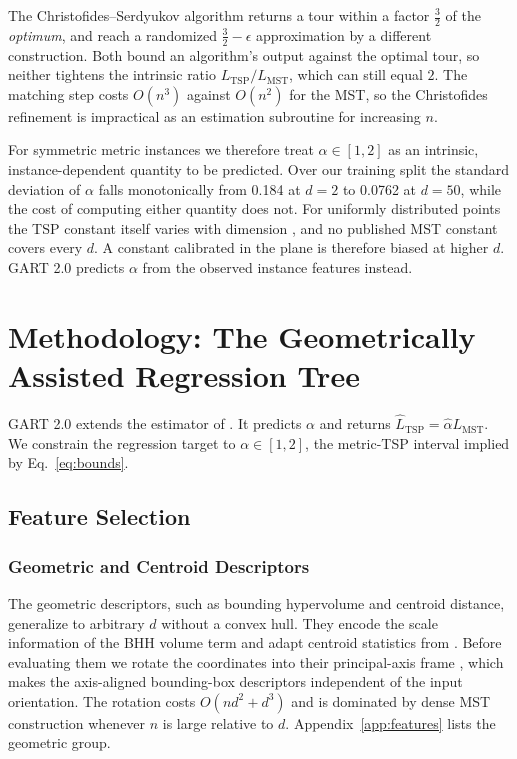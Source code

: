 \documentclass{article}
\begin{document}
The Christofides--Serdyukov algorithm \citep{christofides1976, serdyukov1978} returns a tour within a factor $\tfrac{3}{2}$ of the \emph{optimum}, and \citet{karlin2021slightly} reach a randomized $\tfrac{3}{2}-\epsilon$ approximation by a different construction. Both bound an algorithm's output against the optimal tour, so neither tightens the intrinsic ratio $L_{\mathrm{TSP}}/L_{\mathrm{MST}}$, which can still equal $2$. The matching step costs $O(n^3)$ \citep{edmonds1965,gabow1990,cook1999} against $O(n^2)$ for the MST, so the Christofides refinement is impractical as an estimation subroutine for increasing $n$.

For symmetric metric instances we therefore treat $\alpha \in [1, 2]$ as an intrinsic, instance-dependent quantity to be predicted. Over our training split the standard deviation of $\alpha$ falls monotonically from 0.184 at $d=2$ to 0.0762 at $d=50$, while the cost of computing either quantity does not. For uniformly distributed points the TSP constant itself varies with dimension \citep{percus1996finite}, and no published MST constant covers every $d$. A constant calibrated in the plane is therefore biased at higher $d$. GART 2.0 predicts $\alpha$ from the observed instance features instead.

\section{Methodology: The Geometrically Assisted Regression Tree} \label{sec:methodology}

GART 2.0 extends the estimator of \citet{gart2025}. It predicts $\alpha$ and returns $\hat{L}_{\mathrm{TSP}}=\hat{\alpha}L_{\mathrm{MST}}$. We constrain the regression target to $\alpha\in[1,2]$, the metric-TSP interval implied by Eq.~\eqref{eq:bounds}.

\subsection{Feature Selection} \label{subsec:features}



\subsubsection{Geometric and Centroid Descriptors}

The geometric descriptors, such as bounding hypervolume and centroid distance, generalize to arbitrary $d$ without a convex hull. They encode the scale information of the BHH volume term \citep{bhh1959} and adapt centroid statistics from \citet{cavdar2015distribution}. Before evaluating them we rotate the coordinates into their principal-axis frame \citep{jolliffe2002}, which makes the axis-aligned bounding-box descriptors independent of the input orientation. The rotation costs $O(nd^2+d^3)$ and is dominated by dense MST construction whenever $n$ is large relative to $d$. Appendix~\ref{app:features} lists the geometric group.
\end{document}
